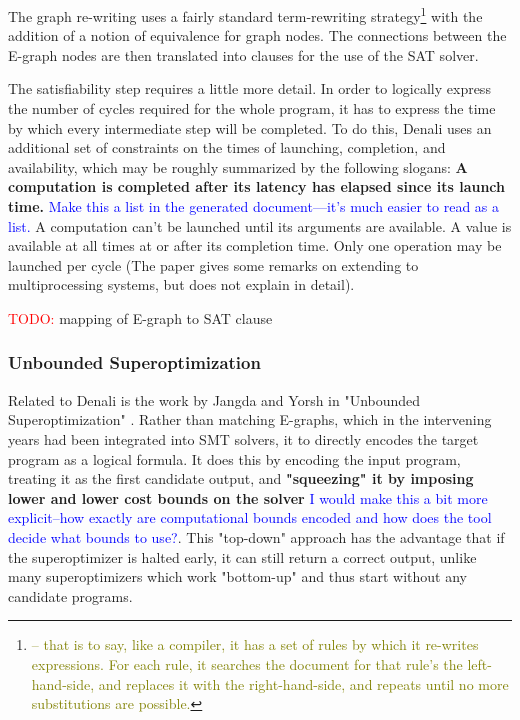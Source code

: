 \documentclass[12pt,twoside]{reedthesis}
\newcommand{\red}[1]{\textcolor{red}{#1}}
\newcommand{\green}[1]{\textcolor{olive}{#1}}
\newcommand{\comment}[2]{\textbf{#1} \textcolor{blue}{#2}}
\newcommand{\addressed}[2]{{#1}}
\begin{document}
The \addressed{graph re-writing}{introduce graph rewriting}
uses a fairly standard term-rewriting strategy\footnote{\green{-- that is to say, like a compiler, it has a set of rules by which it re-writes expressions. For each rule, it searches the document for that rule's the left-hand-side, and replaces it with the right-hand-side, and repeats until no more substitutions are possible.}}
with the addition of a notion of equivalence for graph nodes.
The connections between the E-graph nodes are then translated into clauses for the use of the SAT solver.
    
The satisfiability step requires a little more detail.
In order to logically express the number of cycles required for the whole program, it has to express the time by which every intermediate step will be completed.
To do this, Denali uses an additional set of constraints on the times of launching, completion, and availability, which may be roughly summarized by the following slogans:
    \comment{A computation is completed after its latency has elapsed since its launch time.}{Make this a list in the generated document---it's much easier to read as a list.}
    A computation can't be launched until its arguments are available.
    A value is available at all times at or after its completion time.
    Only one operation may be launched per cycle (The paper gives some remarks on extending to multiprocessing systems, but does not explain in detail).
    
\red{TODO:} mapping of E-graph to SAT clause

\subsubsection{Unbounded Superoptimization}
Related to Denali is the work by Jangda and Yorsh in "Unbounded Superoptimization" \cite{jangda2017unbounded}.
Rather than matching E-graphs, which in the intervening years had been integrated into SMT solvers, it to directly encodes the target program as a logical formula.
It does this by encoding the input program, treating it as the first candidate output, and
    \comment{"squeezing" it by imposing lower and lower cost bounds on the solver}{I would make this a bit more explicit--how exactly are computational bounds encoded and how does the tool decide what bounds to use?}.
This "top-down" approach has the advantage that if the superoptimizer is halted early, it can still return a correct output, unlike many superoptimizers which work "bottom-up" and thus start without any candidate programs.
    
\end{document}
